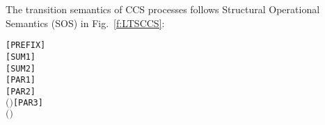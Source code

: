 The transition semantics of CCS processes follows Structural
Operational Semantics (SOS) in Fig.~\ref{f:LTSCCS}:
\begin{alltt}
\HOLTokenTurnstile{} \HOLSymConst{\ensuremath{\ldotp}} \HOLTokenTransBegin{}\HOLTokenTransEnd {}\hfill\texttt{[PREFIX]}
\HOLTokenTurnstile{}  \HOLTokenTransBegin{}\HOLTokenTransEnd {} \HOLSymConst{\HOLTokenImp{}}  \HOLSymConst{\ensuremath{+}}  \HOLTokenTransBegin{}\HOLTokenTransEnd {}\hfill\texttt{[SUM1]}
\HOLTokenTurnstile{}  \HOLTokenTransBegin{}\HOLTokenTransEnd {} \HOLSymConst{\HOLTokenImp{}}  \HOLSymConst{\ensuremath{+}}  \HOLTokenTransBegin{}\HOLTokenTransEnd {}\hfill\texttt{[SUM2]}
\HOLTokenTurnstile{}  \HOLTokenTransBegin{}\HOLTokenTransEnd {} \HOLSymConst{\HOLTokenImp{}}  \HOLSymConst{\ensuremath{\mid}}  \HOLTokenTransBegin{}\HOLTokenTransEnd {} \HOLSymConst{\ensuremath{\mid}} \hfill\texttt{[PAR1]}
\HOLTokenTurnstile{}  \HOLTokenTransBegin{}\HOLTokenTransEnd {} \HOLSymConst{\HOLTokenImp{}}  \HOLSymConst{\ensuremath{\mid}}  \HOLTokenTransBegin{}\HOLTokenTransEnd {} \HOLSymConst{\ensuremath{\mid}} \hfill\texttt{[PAR2]}
\HOLTokenTurnstile{}  \HOLTokenTransBegin{} \HOLTokenTransEnd {} \HOLSymConst{\HOLTokenConj{}}  \HOLTokenTransBegin{} \ensuremath{(} \ensuremath{)}\HOLTokenTransEnd {} \HOLSymConst{\HOLTokenImp{}}  \HOLSymConst{\ensuremath{\mid}}  \HOLTokenTransBegin\HOLSymConst{\ensuremath{\tau}}\HOLTokenTransEnd {} \HOLSymConst{\ensuremath{\mid}} \hfill\texttt{[PAR3]}
\HOLTokenTurnstile{}  \HOLTokenTransBegin{}\HOLTokenTransEnd {} \HOLSymConst{\HOLTokenConj{}} \ensuremath{(} \HOLSymConst{\ensuremath{=}} \HOLSymConst{\ensuremath{\tau}} \HOLSymConst{\HOLTokenDisj{}}  \HOLSymConst{\ensuremath{=}}   \HOLSymConst{\HOLTokenConj{}}  \HOLSymConst{\HOLTokenNotIn{}}  \HOLSymConst{\HOLTokenConj{}}   \HOLSymConst{\HOLTokenNotIn{}} \ensuremath{)} \HOLSymConst{\HOLTokenImp{}}

\end{alltt}
